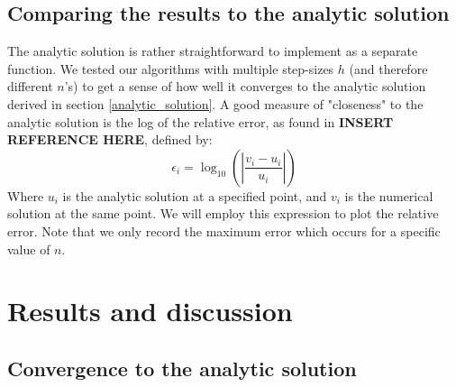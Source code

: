 \documentclass[a4paper, 10pt]{article}
\begin{document}
\subsection{Comparing the results to the analytic solution}\label{compare_error}
The analytic solution is rather straightforward to implement as a separate function. We tested our algorithms with multiple step-sizes $h$ (and therefore different $n$'s) to get a sense of how well it converges to the analytic solution derived in section \ref{analytic_solution}. A good measure of "closeness" to the analytic solution is the log of the relative error, as found in \textbf{INSERT REFERENCE HERE}, defined by:
\begin{equation}\label{eq:relative_error}
\epsilon_i=\log_{10}\left(\left|\frac{v_i-u_i}{u_i}\right|\right)
\end{equation}
Where $u_i$ is the analytic solution at a specified point, and $v_i$ is the numerical solution at the same point. We will employ this expression to plot the relative error. Note that we only record the maximum error which occurs for a specific value of $n$.

\section{Results and discussion}
\subsection{Convergence to the analytic solution}
\end{document}
